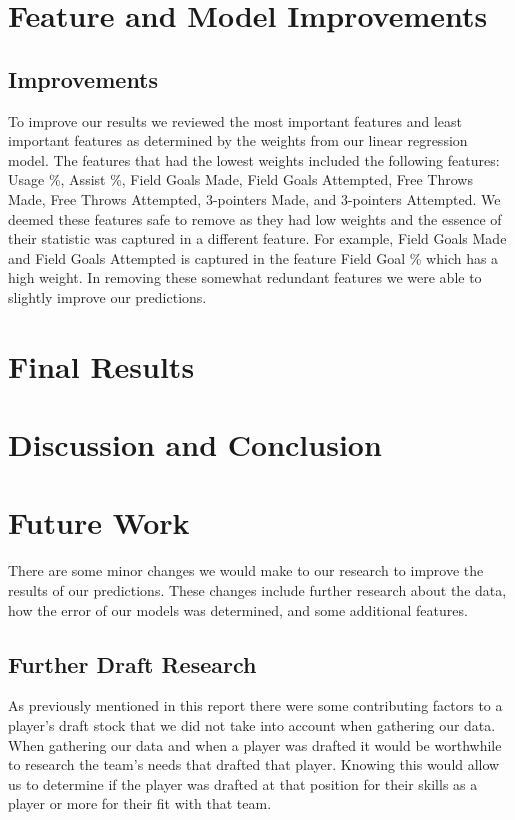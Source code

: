 \documentclass{article}
\begin{document}
\section{Feature and Model Improvements}

\subsection{Improvements}

To improve our results we reviewed the most important features and least
important features as determined by the weights from our linear regression
model. The features that had the lowest weights included the following features:
Usage \%, Assist \%, Field Goals Made, Field Goals Attempted, Free Throws Made,
Free Throws Attempted, 3-pointers Made, and 3-pointers Attempted. We deemed
these features safe to remove as they had low weights and the essence of their
statistic was captured in a different feature. For example, Field Goals Made and
Field Goals Attempted is captured in the feature Field Goal \% which has a high
weight. In removing these somewhat redundant features we were able to slightly
improve our predictions. 


\section{Final Results}

\section{Discussion and Conclusion}

\section{Future Work}

There are some minor changes we would make to our research to improve the
results of our predictions. These changes include further research about the
data, how the error of our models was determined, and some additional features.

\subsection{Further Draft Research}

As previously mentioned in this report there were some contributing factors to a
player’s draft stock that we did not take into account when gathering our data.
When gathering our data and when a player was drafted it would be worthwhile to
research the team’s needs that drafted that player. Knowing this would allow us
to determine if the player was drafted at that position for their skills as a
player or more for their fit with that team.
\end{document}
